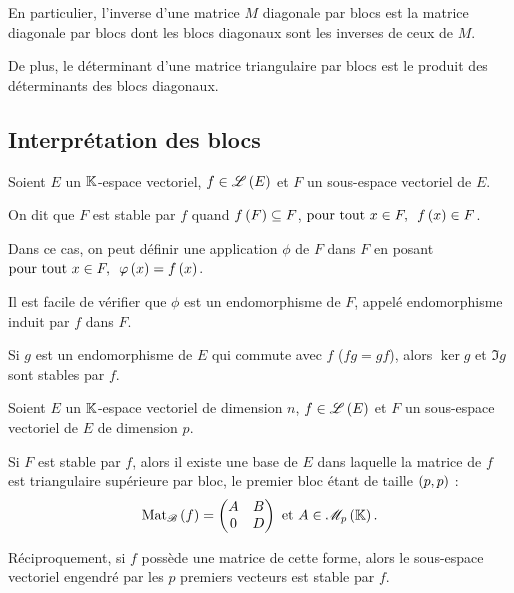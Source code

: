 En particulier, l'inverse d'une matrice \(M\) diagonale par blocs est la matrice diagonale par blocs dont les blocs diagonaux sont les inverses de ceux de \(M\).

De plus, le déterminant d'une matrice triangulaire par blocs est le produit des déterminants des blocs diagonaux.

\subsection{Interprétation des blocs}

\begin{defi}
Soient \(E\) un \(\mathbb{K}\)-espace vectoriel, \(f\in\mathscr{L}\left(E\right)\) et \(F\) un sous-espace vectoriel de \(E\).

On dit que \(F\) est stable par \(f\) quand \(f\left(F\right)\subseteq F\), \ie \(\quantifs{\tpt x\in F}f\paren{x}\in F\).
\end{defi}

Dans ce cas, on peut définir une application \(\phi\) de \(F\) dans \(F\) en posant \(\quantifs{\tpt x\in F}\phi\paren{x}=f\paren{x}\).

Il est facile de vérifier que \(\phi\) est un endomorphisme de \(F\), appelé endomorphisme induit par \(f\) dans \(F\).

\begin{ex}
Si \(g\) est un endomorphisme de \(E\) qui commute avec \(f\) (\ie \(fg=gf\)), alors \(\ker g\) et \(\Im g\) sont stables par \(f\).
\end{ex}

\begin{prop}
Soient \(E\) un \(\mathbb{K}\)-espace vectoriel de dimension \(n\), \(f\in\mathscr{L}\left(E\right)\) et \(F\) un sous-espace vectoriel de \(E\) de dimension \(p\).

Si \(F\) est stable par \(f\), alors il existe une base de \(E\) dans laquelle la matrice de \(f\) est triangulaire supérieure par bloc, le premier bloc étant de taille \(\left(p,p\right)\) : \[\Mat{f}=\begin{pmatrix}
A & B \\
0 & D
\end{pmatrix}\text{ et }A\in\M{p}.\]

Réciproquement, si \(f\) possède une matrice de cette forme, alors le sous-espace vectoriel engendré par les \(p\) premiers vecteurs est stable par \(f\).
\end{prop}

